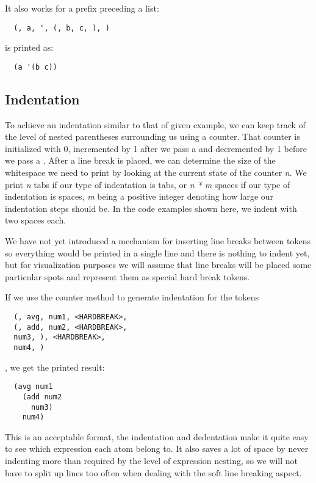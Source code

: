 It also works for a prefix preceding a list:
\begin{verbatim}
  (, a, ', (, b, c, ), )
\end{verbatim}
is printed as:
\begin{verbatim}
  (a '(b c))
\end{verbatim}

\subsection{Indentation}
To achieve an indentation similar to that of given example,
we can keep track of the level of nested parentheses surrounding us using a counter.
That counter is initialized with 0,
incremented by 1 after we pass a  and
decremented by 1 before we pass a .
After a line break is placed, we can determine the size of the whitespace we need to print
by looking at the current state of the counter \textit{n}.
We print \textit{n} tabs if our type of indentation is tabs,
or \textit{n * m} spaces if our type of indentation is spaces,
\textit{m} being a positive integer denoting how large our indentation steps should be.
In the code examples shown here, we indent with two spaces each.

We have not yet introduced a mechanism for inserting line breaks between tokens
so everything would be printed in a single line and there is nothing to indent yet,
but for visualization purposes we will assume that line breaks will be placed
some particular spots and represent them as special hard break tokens.

If we use the counter method to generate indentation for the tokens
\begin{verbatim}
  (, avg, num1, <HARDBREAK>,
  (, add, num2, <HARDBREAK>,
  num3, ), <HARDBREAK>,
  num4, )
\end{verbatim}
, we get the printed result:
\begin{verbatim}
  (avg num1
    (add num2
      num3)
    num4)
\end{verbatim}
This is an acceptable format, the indentation and dedentation make it
quite easy to see which expression each atom belong to.
It also saves a lot of space by never indenting more than required by the level of expression nesting,
so we will not have to split up lines too often when dealing with the soft line breaking aspect.

